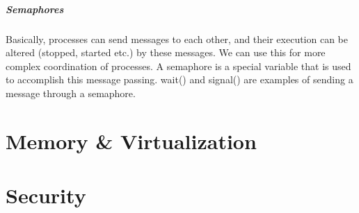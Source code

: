 \documentclass[12pt]{article}
\theoremstyle{definition}
\begin{document}
\subsubsection{Semaphores}
Basically, processes can send messages to each other, and their execution can be altered (stopped, started etc.) by these messages. We can use this for more complex coordination of processes. A semaphore is a special variable that is used to accomplish this message passing. wait() and signal() are examples of sending a message through a semaphore.
\\ \linebreak


\part{Memory \& Virtualization}

\part{Security}
\end{document}
